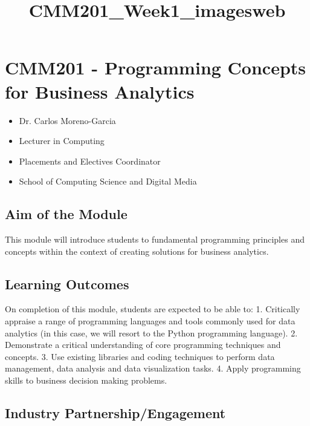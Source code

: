 \documentclass[11pt]{article}
\title{CMM201\_Week1\_imagesweb}
\providecommand{\tightlist}{%
      \setlength{\itemsep}{0pt}\setlength{\parskip}{0pt}}
\begin{document}
    
    
    \maketitle
    
    

    
    \section{CMM201 - Programming Concepts for Business
Analytics}\label{cmm201---programming-concepts-for-business-analytics}

\begin{itemize}
\tightlist
\item
  Dr. Carlos Moreno-Garcia
\item
  Lecturer in Computing
\item
  Placements and Electives Coordinator
\item
  School of Computing Science and Digital Media
\end{itemize}

    \subsection{Aim of the Module}\label{aim-of-the-module}

This module will introduce students to fundamental programming
principles and concepts within the context of creating solutions for
business analytics.

    \subsection{Learning Outcomes}\label{learning-outcomes}

On completion of this module, students are expected to be able to: 1.
Critically appraise a range of programming languages and tools commonly
used for data analytics (in this case, we will resort to the Python
programming language). 2. Demonstrate a critical understanding of core
programming techniques and concepts. 3. Use existing libraries and
coding techniques to perform data management, data analysis and data
visualization tasks. 4. Apply programming skills to business decision
making problems.

    \subsection{Industry
Partnership/Engagement}\label{industry-partnershipengagement}
\end{document}
